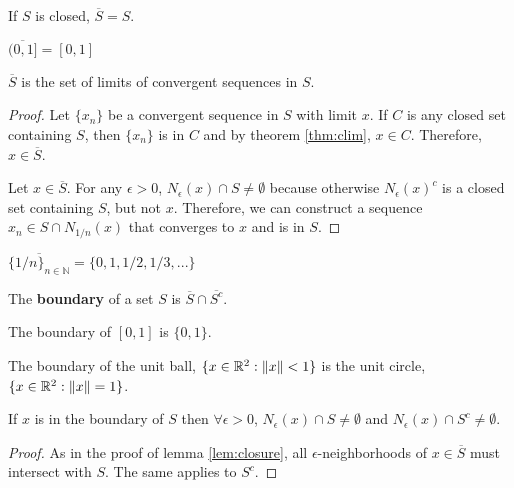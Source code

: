 \begin{example}
  If $S$ is closed, $\overline{S} = S$. 
\end{example}
\begin{example}
  $\overline{(0,1]} = [0,1]$
\end{example}
\begin{lemma}\label{lem:closure}
  $\overline{S}$ is the set of limits of convergent sequences in $S$.
\end{lemma}
\begin{proof}
  Let $\{x_n\}$ be a convergent sequence in $S$ with limit $x$. If $C$
  is any closed set containing $S$, then $\{x_n\}$ is in $C$ and by
  theorem \ref{thm:clim}, $x \in C$. Therefore, $x \in \overline{S}$. 
  
  Let $x \in \overline{S}$. For any $\epsilon>0$, $N_\epsilon(x) \cap
  S \neq \emptyset$ because otherwise $N_\epsilon(x)^c$ is a closed
  set containing $S$, but not $x$. Therefore, we can construct a
  sequence $x_n \in S \cap N_{1/n}(x)$ that converges to $x$ and is in
  $S$. 
\end{proof}
\begin{example}
  $\overline{\{1/n\}_{n \in \mathbb{N}}} = \{0, 1, 1/2, 1/3, ... \}$
\end{example}
\begin{definition}
  The \textbf{boundary} of a set $S$ is $\overline{S} \cap
  \overline{S^c}$. 
\end{definition}
\begin{example}
  The boundary of $[0,1]$ is $\{0,1\}$.
\end{example}
\begin{example}
  The boundary of the unit ball, $\{x \in \mathbb{R}^2: \left\Vert {x} \right\Vert < 1\}$ is the
  unit circle, $\{x \in \mathbb{R}^2: \left\Vert {x} \right\Vert = 1\}$.
\end{example}
\begin{lemma}
  If $x$ is in the boundary of $S$ then $\forall \epsilon>0$,
  $N_\epsilon(x) \cap S \neq \emptyset$ and $N_\epsilon(x) \cap S^c
  \neq \emptyset$. 
\end{lemma}
\begin{proof}
  As in the proof of lemma \ref{lem:closure}, all
  $\epsilon$-neighborhoods of $x \in \overline{S}$ must intersect with
  $S$. The same applies to $S^c$. 
\end{proof}

